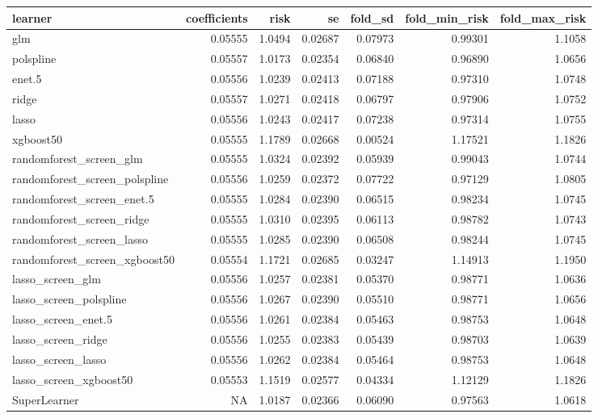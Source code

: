 \documentclass[12pt, krantz2,]{book}
\theoremstyle{definition}
\theoremstyle{definition}
\theoremstyle{definition}
\newcommand{\1}{\mathbbm{1}}
\begin{document}
\begin{tabular}{l|r|r|r|r|r|r}
\hline
learner & coefficients & risk & se & fold\_sd & fold\_min\_risk & fold\_max\_risk\\
\hline
glm & 0.05555 & 1.0494 & 0.02687 & 0.07973 & 0.99301 & 1.1058\\
\hline
polspline & 0.05557 & 1.0173 & 0.02354 & 0.06840 & 0.96890 & 1.0656\\
\hline
enet.5 & 0.05556 & 1.0239 & 0.02413 & 0.07188 & 0.97310 & 1.0748\\
\hline
ridge & 0.05557 & 1.0271 & 0.02418 & 0.06797 & 0.97906 & 1.0752\\
\hline
lasso & 0.05556 & 1.0243 & 0.02417 & 0.07238 & 0.97314 & 1.0755\\
\hline
xgboost50 & 0.05555 & 1.1789 & 0.02668 & 0.00524 & 1.17521 & 1.1826\\
\hline
randomforest\_screen\_glm & 0.05555 & 1.0324 & 0.02392 & 0.05939 & 0.99043 & 1.0744\\
\hline
randomforest\_screen\_polspline & 0.05556 & 1.0259 & 0.02372 & 0.07722 & 0.97129 & 1.0805\\
\hline
randomforest\_screen\_enet.5 & 0.05555 & 1.0284 & 0.02390 & 0.06515 & 0.98234 & 1.0745\\
\hline
randomforest\_screen\_ridge & 0.05555 & 1.0310 & 0.02395 & 0.06113 & 0.98782 & 1.0743\\
\hline
randomforest\_screen\_lasso & 0.05555 & 1.0285 & 0.02390 & 0.06508 & 0.98244 & 1.0745\\
\hline
randomforest\_screen\_xgboost50 & 0.05554 & 1.1721 & 0.02685 & 0.03247 & 1.14913 & 1.1950\\
\hline
lasso\_screen\_glm & 0.05556 & 1.0257 & 0.02381 & 0.05370 & 0.98771 & 1.0636\\
\hline
lasso\_screen\_polspline & 0.05556 & 1.0267 & 0.02390 & 0.05510 & 0.98771 & 1.0656\\
\hline
lasso\_screen\_enet.5 & 0.05556 & 1.0261 & 0.02384 & 0.05463 & 0.98753 & 1.0648\\
\hline
lasso\_screen\_ridge & 0.05556 & 1.0255 & 0.02383 & 0.05439 & 0.98703 & 1.0639\\
\hline
lasso\_screen\_lasso & 0.05556 & 1.0262 & 0.02384 & 0.05464 & 0.98753 & 1.0648\\
\hline
lasso\_screen\_xgboost50 & 0.05553 & 1.1519 & 0.02577 & 0.04334 & 1.12129 & 1.1826\\
\hline
SuperLearner & NA & 1.0187 & 0.02366 & 0.06090 & 0.97563 & 1.0618\\
\hline
\end{tabular}
\end{document}
